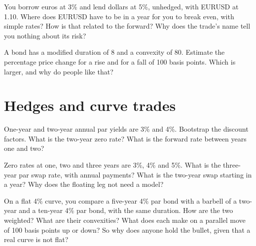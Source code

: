 \begin{question}\label{iq:iv2:rates-and-fx:12}
You borrow euros at 3\% and lend dollars at 5\%, unhedged, with EURUSD at 1.10. Where does EURUSD have to be in a year for you to break even, with simple rates? How is that related to the forward? Why does the trade's name tell you nothing about its risk?
\end{question}

\begin{question}\label{iq:iv2:rates-and-fx:13}
A bond has a modified duration of 8 and a convexity of 80. Estimate the percentage price change for a rise and for a fall of 100 basis points. Which is larger, and why do people like that?
\end{question}

\section{Hedges and curve trades}

\begin{question}\label{iq:iv2:rates-and-fx:14}
One-year and two-year annual par yields are 3\% and 4\%. Bootstrap the discount factors. What is the two-year zero rate? What is the forward rate between years one and two?
\end{question}

\begin{question}\label{iq:iv2:rates-and-fx:15}
Zero rates at one, two and three years are 3\%, 4\% and 5\%. What is the three-year par swap rate, with annual payments? What is the two-year swap starting in a year? Why does the floating leg not need a model?
\end{question}

\begin{question}\label{iq:iv2:rates-and-fx:16}
On a flat 4\% curve, you compare a five-year 4\% par bond with a barbell of a two-year and a ten-year 4\% par bond, with the same duration. How are the two weighted? What are their convexities? What does each make on a parallel move of 100 basis points up or down? So why does anyone hold the bullet, given that a real curve is not flat?
\end{question}

